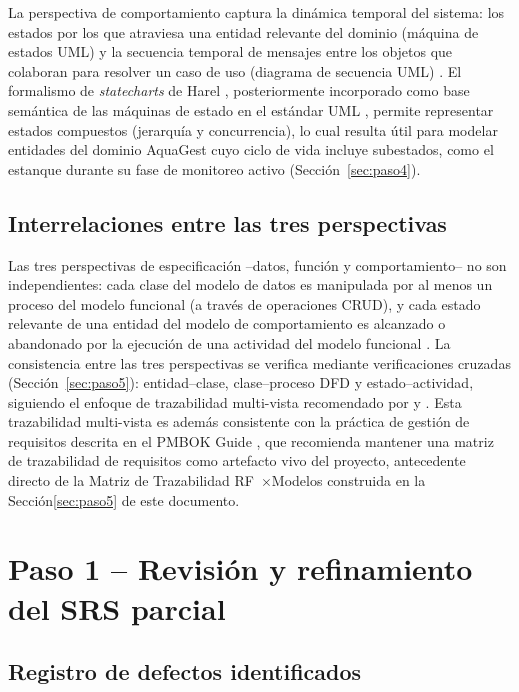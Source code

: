 \documentclass[11pt,a4paper]{report}
\begin{document}
La perspectiva de comportamiento captura la dinámica temporal del sistema: los estados por los que atraviesa una entidad relevante del dominio (máquina de estados UML) y la secuencia temporal de mensajes entre los objetos que colaboran para resolver un caso de uso (diagrama de secuencia UML) \cite{harel1987statecharts,omg2017uml}. El formalismo de \emph{statecharts} de Harel \cite{harel1987statecharts}, posteriormente incorporado como base semántica de las máquinas de estado en el estándar UML \cite{omg2017uml}, permite representar estados compuestos (jerarquía y concurrencia), lo cual resulta útil para modelar entidades del dominio AquaGest cuyo ciclo de vida incluye subestados, como el estanque durante su fase de monitoreo activo (Sección~\ref{sec:paso4}).

\section{Interrelaciones entre las tres perspectivas}

Las tres perspectivas de especificación --datos, función y comportamiento-- no son independientes: cada clase del modelo de datos es manipulada por al menos un proceso del modelo funcional (a través de operaciones CRUD), y cada estado relevante de una entidad del modelo de comportamiento es alcanzado o abandonado por la ejecución de una actividad del modelo funcional \cite{pohl2025,maciaszek2007}. La consistencia entre las tres perspectivas se verifica mediante verificaciones cruzadas (Sección~\ref{sec:paso5}): entidad--clase, clase--proceso DFD y estado--actividad, siguiendo el enfoque de trazabilidad multi-vista recomendado por \cite{iso15288} y \cite{iso29148}. 
Esta trazabilidad multi-vista es además consistente con la práctica de gestión de requisitos descrita en el PMBOK Guide \cite{pmi2021pmbok}, que recomienda mantener una matriz de trazabilidad de requisitos como artefacto vivo del proyecto, antecedente directo de la Matriz de Trazabilidad RF~$\times$Modelos construida en la Sección\ref{sec:paso5} de este documento.

\chapter{Paso 1 -- Revisión y refinamiento del SRS parcial}
\label{sec:paso1}

\section{Registro de defectos identificados}
\end{document}
